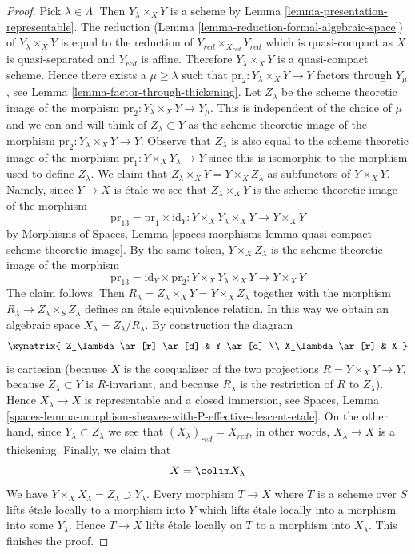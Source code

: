 \begin{proof}
\medskip\noindent
Pick $\lambda \in \Lambda$. Then $Y_\lambda \times_X Y$ is a scheme by
Lemma \ref{lemma-presentation-representable}. The reduction
(Lemma \ref{lemma-reduction-formal-algebraic-space})
of $Y_\lambda \times_X Y$ is equal to the reduction of
$Y_{red} \times_{X_{red}} Y_{red}$ which is quasi-compact as $X$
is quasi-separated and $Y_{red}$ is affine.
Therefore $Y_\lambda \times_X Y$ is a quasi-compact scheme.
Hence there exists a $\mu \geq \lambda$ such that
$\text{pr}_2 : Y_\lambda \times_X Y \to Y$ factors
through $Y_\mu$, see Lemma \ref{lemma-factor-through-thickening}.
Let $Z_\lambda$ be the scheme theoretic image of the morphism
$\text{pr}_2 : Y_\lambda \times_X Y \to Y_\mu$.
This is independent of the choice of $\mu$ and we can and
will think of $Z_\lambda \subset Y$ as the scheme theoretic
image of the morphism $\text{pr}_2 : Y_\lambda \times_X Y \to Y$.
Observe that $Z_\lambda$ is also equal to the scheme theoretic image
of the morphism $\text{pr}_1 : Y \times_X Y_\lambda \to Y$ since
this is isomorphic to the morphism used to define $Z_\lambda$.
We claim that $Z_\lambda \times_X Y = Y \times_X Z_\lambda$ as subfunctors
of $Y \times_X Y$. Namely, since $Y \to X$ is \'etale we see that
$Z_\lambda \times_X Y$ is the scheme theoretic image of the morphism
$$
\text{pr}_{13} = \text{pr}_1 \times \text{id}_Y :
Y \times_X Y_\lambda \times_X Y \longrightarrow Y \times_X Y
$$
by Morphisms of Spaces, Lemma
\ref{spaces-morphisms-lemma-quasi-compact-scheme-theoretic-image}.
By the same token, $Y \times_X Z_\lambda$ is the scheme theoretic image
of the morphism
$$
\text{pr}_{13} = \text{id}_Y \times \text{pr}_2 : 
Y \times_X Y_\lambda \times_X Y \longrightarrow Y \times_X Y
$$
The claim follows. Then
$R_\lambda = Z_\lambda \times_X Y = Y \times_X Z_\lambda$
together with the morphism $R_\lambda \to Z_\lambda \times_S Z_\lambda$
defines an \'etale equivalence relation. In this way we obtain an algebraic
space $X_\lambda = Z_\lambda/R_\lambda$. By construction the diagram
$$
\xymatrix{
Z_\lambda \ar[r] \ar[d] & Y \ar[d] \\
X_\lambda \ar[r] & X
}
$$
is cartesian (because $X$ is the coequalizer of the two projections
$R = Y \times_X Y \to Y$, because $Z_\lambda \subset Y$ is $R$-invariant,
and because $R_\lambda$ is the restriction of $R$ to $Z_\lambda$).
Hence $X_\lambda \to X$ is representable and a closed immersion, see
Spaces, Lemma
\ref{spaces-lemma-morphism-sheaves-with-P-effective-descent-etale}.
On the other hand, since $Y_\lambda \subset Z_\lambda$ we see that
$(X_\lambda)_{red} = X_{red}$, in other words, $X_\lambda \to X$
is a thickening. Finally, we claim that
$$
X = \colim X_\lambda
$$
We have $Y \times_X X_\lambda = Z_\lambda \supset Y_\lambda$. Every
morphism $T \to X$ where $T$ is a scheme over $S$ lifts \'etale locally
to a morphism into $Y$ which lifts \'etale locally into a morphism
into some $Y_\lambda$. Hence $T \to X$ lifts \'etale locally on
$T$ to a morphism into $X_\lambda$. This finishes the proof.
\end{proof}